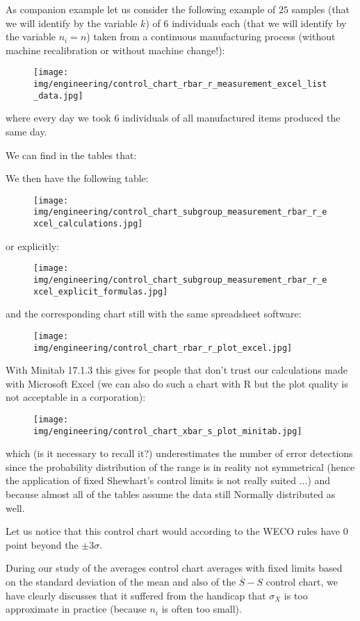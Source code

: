 	As companion example let us consider the following example of $25$ samples (that we will identify by the variable $k$) of $6$ individuals each (that we will identify by the variable $n_i=n$) taken from a continuous manufacturing process (without machine recalibration or without machine change!):
	\begin{figure}[H]
		\centering
		\texttt{[image: img/engineering/control\_chart\_rbar\_r\_measurement\_excel\_list\_data.jpg]}
	\end{figure}
	where every day we took $6$ individuals of all manufactured items produced the same day.
	
	We can find in the tables that:
	
	We then have the following table:
	\begin{figure}[H]
		\centering
		\texttt{[image: img/engineering/control\_chart\_subgroup\_measurement\_rbar\_r\_excel\_calculations.jpg]}
	\end{figure}
	or explicitly:
	\begin{figure}[H]
		\centering
		\texttt{[image: img/engineering/control\_chart\_subgroup\_measurement\_rbar\_r\_excel\_explicit\_formulas.jpg]}
	\end{figure}
	and the corresponding chart still with the same spreadsheet software:
	\begin{figure}[H]
		\centering
		\texttt{[image: img/engineering/control\_chart\_rbar\_r\_plot\_excel.jpg]}
	\end{figure}
	With Minitab 17.1.3 this gives for people that don't trust our calculations made with Microsoft Excel (we can also do such a chart with R but the plot quality is not acceptable in a corporation):
	\begin{figure}[H]
		\centering
		\texttt{[image: img/engineering/control\_chart\_xbar\_s\_plot\_minitab.jpg]}
	\end{figure}
	which (is it necessary to recall it?) underestimates the number of error detections since the probability distribution of the range is in reality not symmetrical (hence the application of fixed Shewhart's control limits is not really suited ...) and because almost all of the tables assume the data still Normally distributed as well.
	
	Let us notice that this control chart would according to the WECO rules have $0$ point beyond the $\pm 3\sigma$.
	
	During our study of the averages control chart averages with fixed limits based on the standard deviation of the mean and also of the $\overline{S}-S$ control chart, we have clearly discusses that it suffered from the handicap that $\sigma_X$ is too approximate in practice (because $n_i$ is often too small).

